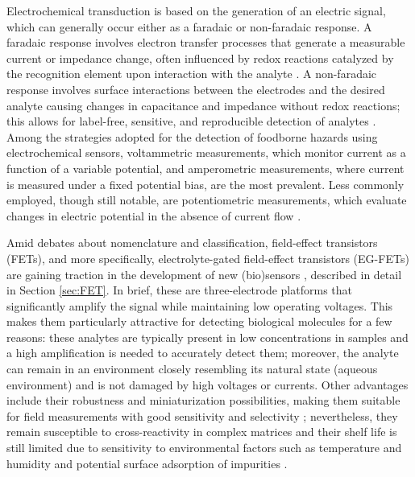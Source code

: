 Electrochemical transduction is based on the generation of an electric signal, which can generally occur either as a faradaic or non-faradaic response. A faradaic response involves electron transfer processes that generate a measurable current or impedance change, often influenced by redox reactions catalyzed by the recognition element upon interaction with the analyte \citep{adamExploring2024}. A non-faradaic response involves surface interactions between the electrodes and the desired analyte causing changes in capacitance and impedance without redox reactions; this allows for label-free, sensitive, and reproducible detection of analytes \citep{kellNonFaradaic1991}. Among the strategies adopted for the detection of foodborne hazards using electrochemical sensors, voltammetric measurements, which monitor current as a function of a variable potential, and amperometric measurements, where current is measured under a fixed potential bias, are the most prevalent. Less commonly employed, though still notable, are potentiometric measurements, which evaluate changes in electric potential in the absence of current flow \citep{hulanickiChemical1991}.

Amid debates about nomenclature and classification, field-effect transistors (FETs), and more specifically, electrolyte-gated field-effect transistors (EG-FETs) are gaining traction in the development of new (bio)sensors \citep{minamikiExtendedgate2015, nakatsukaAptamer2018, shkodraElectrolytegated2021}, described in detail in Section \ref{sec:FET}. In brief, these are three-electrode platforms that significantly amplify the signal while maintaining low operating voltages. This makes them particularly attractive for detecting biological molecules for a few reasons: these analytes are typically present in low concentrations in samples and a high amplification is needed to accurately detect them; moreover, the analyte can remain in an environment closely resembling its natural state (aqueous environment) and is not damaged by high voltages or currents. Other advantages include their robustness and miniaturization possibilities, making them suitable for field measurements with good sensitivity and selectivity \citep{grieshaberElectrochemical2008}; nevertheless, they remain susceptible to cross-reactivity in complex matrices and their shelf life is still limited due to sensitivity to environmental factors such as temperature and humidity and potential surface adsorption of impurities \citep{fleetElectrochemical1992, williamsElectrochemical2020}.

